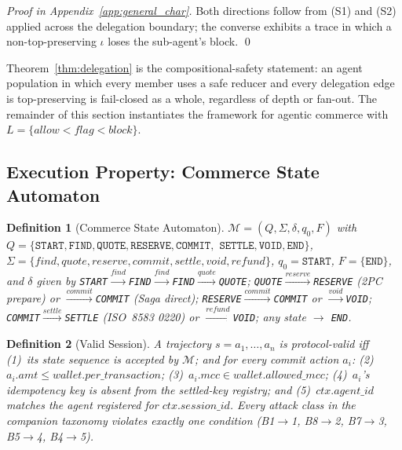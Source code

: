 \documentclass{article}
\newtheorem{definition}{Definition}
\begin{document}
\begin{proof}[Proof in Appendix~\ref{app:general_char}]
Both directions follow from (S1) and (S2) applied across the delegation boundary; the
converse exhibits a trace in which a non-top-preserving $\iota$ loses the sub-agent's block. \qed
\end{proof}

Theorem~\ref{thm:delegation} is the compositional-safety statement: an agent
population in which every member uses a safe reducer and every delegation edge is
top-preserving is fail-closed as a whole, regardless of depth or fan-out. The
remainder of this section instantiates the framework for agentic commerce with
$L=\{\textit{allow}<\textit{flag}<\textit{block}\}$.

\subsection{Execution Property: Commerce State Automaton}
\label{sec:automaton}

\begin{definition}[Commerce State Automaton]
$\mathcal{M} = (Q, \Sigma, \delta, q_0, F)$ with
$Q = \{\texttt{START}, \texttt{FIND}, \texttt{QUOTE}, \texttt{RESERVE}, \texttt{COMMIT},$
$\texttt{SETTLE}, \texttt{VOID}, \texttt{END}\}$,
$\Sigma = \{\textit{find},\textit{quote},\textit{reserve},\textit{commit},\textit{settle},\textit{void},\textit{refund}\}$,
$q_0 = \texttt{START}$, $F = \{\texttt{END}\}$, and $\delta$ given by
\texttt{START}$\xrightarrow{\textit{find}}$\texttt{FIND}$\xrightarrow{\textit{find}}$\texttt{FIND}$\xrightarrow{\textit{quote}}$\texttt{QUOTE};
\texttt{QUOTE}$\xrightarrow{\textit{reserve}}$\texttt{RESERVE} (2PC prepare) or
$\xrightarrow{\textit{commit}}$\texttt{COMMIT} (Saga direct);
\texttt{RESERVE}$\xrightarrow{\textit{commit}}$\texttt{COMMIT} or $\xrightarrow{\textit{void}}$\texttt{VOID};
\texttt{COMMIT}$\xrightarrow{\textit{settle}}$\texttt{SETTLE} (ISO~8583 0220) or
$\xrightarrow{\textit{refund}}$\texttt{VOID}; any state $\to$ \texttt{END}.
\end{definition}

\begin{definition}[Valid Session]
\label{def:valid_session}
A trajectory $s = a_1,\ldots,a_n$ is \emph{protocol-valid} iff (1)~its state sequence is
accepted by $\mathcal{M}$; and for every \textit{commit} action $a_i$:
(2)~$a_i.\textit{amt} \le \textit{wallet.per\_transaction}$;
(3)~$a_i.\textit{mcc} \in \textit{wallet.allowed\_mcc}$;
(4)~$a_i$'s idempotency key is absent from the settled-key registry; and
(5)~$\textit{ctx.agent\_id}$ matches the agent registered for $\textit{ctx.session\_id}$.
Every attack class in the companion taxonomy violates exactly one condition
(B1$\to$1, B8$\to$2, B7$\to$3, B5$\to$4, B4$\to$5).
\end{definition}
\end{document}
